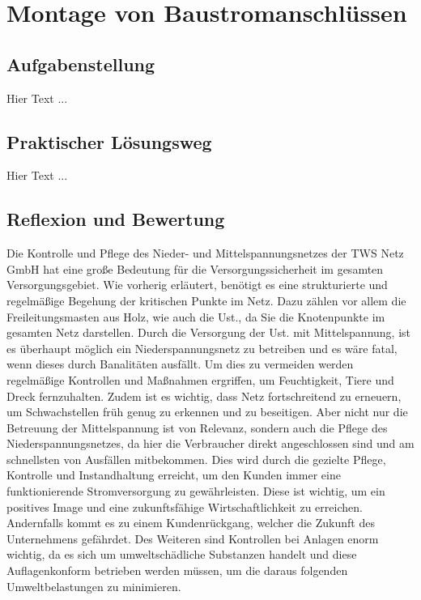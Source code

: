 \chapter{Montage von Baustromanschlüssen}
\label{cha:Baustromanschlüsse}


\section{Aufgabenstellung}

Hier Text ...

\section{Praktischer Lösungsweg}

Hier Text ...

\section{Reflexion und Bewertung}

Die Kontrolle und Pflege des Nieder- und Mittelspannungsnetzes der TWS Netz GmbH hat eine große Bedeutung für die Versorgungssicherheit im gesamten Versorgungsgebiet. Wie vorherig erläutert, benötigt es eine strukturierte und regelmäßige Begehung der kritischen Punkte im Netz. Dazu zählen vor allem die Freileitungsmasten aus Holz, wie auch die Ust., da Sie die Knotenpunkte im gesamten Netz darstellen. Durch die Versorgung der Ust. mit Mittelspannung, ist es überhaupt möglich ein Niederspannungsnetz zu betreiben und es wäre fatal, wenn dieses durch Banalitäten ausfällt. Um dies zu vermeiden werden regelmäßige Kontrollen und Maßnahmen ergriffen, um \zB Feuchtigkeit, Tiere und Dreck fernzuhalten. Zudem ist es wichtig, dass Netz fortschreitend zu erneuern, um Schwachstellen früh genug zu erkennen und zu beseitigen. Aber nicht nur die Betreuung der Mittelspannung ist von Relevanz, sondern auch die Pflege des Niederspannungsnetzes, da hier die Verbraucher direkt angeschlossen sind und am schnellsten von Ausfällen mitbekommen. Dies wird durch die gezielte Pflege, Kontrolle und Instandhaltung erreicht, um den Kunden immer eine funktionierende Stromversorgung zu gewährleisten. Diese ist wichtig, um ein positives Image und eine zukunftsfähige Wirtschaftlichkeit zu erreichen. Andernfalls kommt es zu einem Kundenrückgang, welcher die Zukunft des Unternehmens gefährdet. Des Weiteren sind Kontrollen bei  Anlagen enorm wichtig, da es sich um umweltschädliche Substanzen handelt und diese Auflagenkonform betrieben werden müssen, um die daraus folgenden Umweltbelastungen zu minimieren. 

\clearpage

